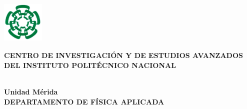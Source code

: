 
\begin{minipage}{2.3cm}\vspace{-6.0cm}\hspace{-4.0cm}
  \includegraphics[width=2.0cm,height=2.0cm]{images/logo}
\end{minipage}
\begin{center}
  \vspace{-4.6cm} 
  \begin{large}
    {\bf \hspace{-2.8cm}\textsf{CENTRO DE INVESTIGACIÓN Y DE ESTUDIOS AVANZADOS}}\\ 
    \smallskip 
    {\bf \hspace{-2.8cm}\textsf{DEL INSTITUTO POLITÉCNICO NACIONAL}} 
  \end{large}
  \\
  \smallskip 
  {\bf \hspace{-2.8cm}
    {\small Unidad M\'{e}rida}\\
    \bigskip \hspace{-2.8cm}
    \textsf{DEPARTAMENTO DE FÍSICA APLICADA}}
\end{center}

